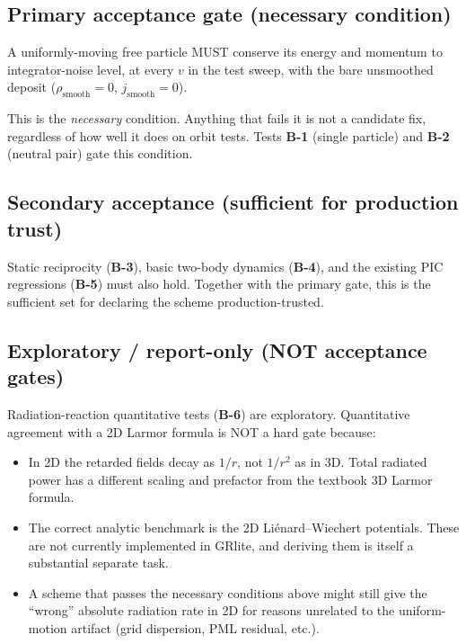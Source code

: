 \documentclass[11pt,a4paper]{article}
\begin{document}
\subsection{Primary acceptance gate (necessary condition)}

A uniformly-moving free particle MUST conserve its energy and momentum
to integrator-noise level, at every $v$ in the test sweep, with the
bare unsmoothed deposit ($\rho_{\mathrm{smooth}}=0$,
$j_{\mathrm{smooth}}=0$).

This is the \emph{necessary} condition.  Anything that fails it is not
a candidate fix, regardless of how well it does on orbit tests.
Tests \textbf{B-1} (single particle) and \textbf{B-2} (neutral pair)
gate this condition.

\subsection{Secondary acceptance (sufficient for production trust)}

Static reciprocity (\textbf{B-3}), basic two-body dynamics
(\textbf{B-4}), and the existing PIC regressions (\textbf{B-5})
must also hold.  Together with the primary gate, this is the
sufficient set for declaring the scheme production-trusted.

\subsection{Exploratory / report-only (NOT acceptance gates)}

Radiation-reaction quantitative tests (\textbf{B-6}) are exploratory.
Quantitative agreement with a 2D Larmor formula is NOT a hard gate
because:

\begin{itemize}
  \item In 2D the retarded fields decay as $1/r$, not $1/r^2$ as in
    3D.  Total radiated power has a different scaling and prefactor
    from the textbook 3D Larmor formula.
  \item The correct analytic benchmark is the 2D Liénard--Wiechert
    potentials.  These are not currently implemented in GRlite, and
    deriving them is itself a substantial separate task.
  \item A scheme that passes the necessary conditions above might
    still give the ``wrong'' absolute radiation rate in 2D for
    reasons unrelated to the uniform-motion artifact (grid
    dispersion, PML residual, etc.).
\end{itemize}
\end{document}
